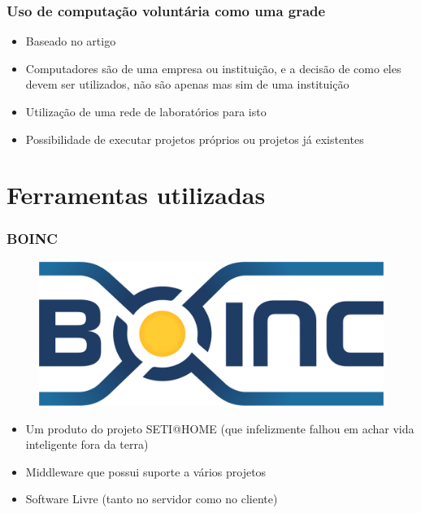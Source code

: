 \documentclass{beamer}
\begin{document}
\begin{frame}
  \frametitle{Uso de computação voluntária como uma grade}
  \begin{itemize}
    \item Baseado no artigo \cite{boinc}
    \item Computadores são de uma empresa ou instituição, e a decisão de como eles devem ser utilizados, não são apenas mas sim de uma instituição
    \item Utilização de uma rede de laboratórios para isto
    \item Possibilidade de executar projetos próprios ou projetos já existentes
  \end{itemize}
\end{frame}


\section{Ferramentas utilizadas}

\begin{frame}
  \frametitle{BOINC}
    \begin{figure}
      \includegraphics[scale=0.3]{boinc.png}
    \end{figure}
  
  \begin{itemize}
    \item Um produto do projeto SETI@HOME (que infelizmente falhou em achar vida inteligente fora da terra)
    \item Middleware que possui suporte a vários projetos 
    \item Software Livre (tanto no servidor como no cliente)
  \end{itemize}

  
\end{frame}
\end{document}
